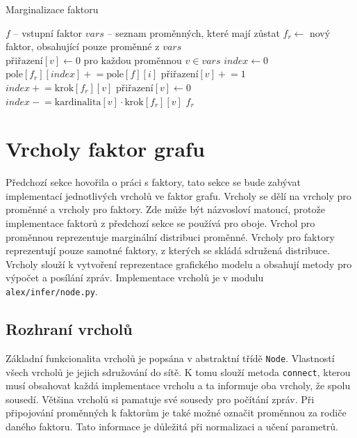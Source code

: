 \begin{algorithm}
\caption{Marginalizace faktoru}
\label{alg:marg}
\begin{algorithmic}
\State $f$ -- vstupní faktor
\State $vars$ -- seznam proměnných, které mají zůstat
\State
\State $f_r \gets$ nový faktor, obsahující pouze proměnné z $vars$
\State $\text{přiřazení}[v] \gets 0 \text{ pro každou proměnnou } v \in vars$
\State $index \gets 0$ 
\State
{}
	\State $\text{pole}[f_r][index] \mathrel{+}= \text{pole}[f][i]$
	\State
			\State $\text{přiřazení}[v] \mathrel{+}= 1$
			\State $index \mathrel{+}= \text{krok}[f_r][v]$
		\EndIf
		\State
			\State $\text{přiřazení}[v] \gets 0$
			\State $index \mathrel{-}= \text{kardinalita}[v] \cdot \text{krok}[f_r][v]$
		\EndIf
	\EndFor
\EndFor
\State \Return $f_r$
\EndFunction
\end{algorithmic}
\end{algorithm}

\section{Vrcholy faktor grafu}

Předchozí sekce hovořila o práci s faktory, tato sekce se bude zabývat implementací jednotlivých vrcholů ve faktor grafu.
Vrcholy se dělí na vrcholy pro proměnné a vrcholy pro faktory.
Zde může být názvosloví matoucí, protože implementace faktorů z předchozí sekce se používá pro oboje.
Vrchol pro proměnnou reprezentuje marginální distribuci proměnné.
Vrcholy pro faktory reprezentují pouze samotné faktory, z kterých se skládá sdružená distribuce.
Vrcholy slouží k vytvoření reprezentace grafického modelu a obsahují metody pro výpočet a posílání zpráv.
Implementace vrcholů je v modulu \texttt{alex/infer/node.py}.

\subsection{Rozhraní vrcholů}

Základní funkcionalita vrcholů je popsána v abstraktní třídě \texttt{Node}.
Vlastností všech vrcholů je jejich sdružování do sítě.
K tomu slouží metoda \texttt{connect}, kterou musí obsahovat každá implementace vrcholu a ta informuje oba vrcholy, že spolu sousedí.
Většina vrcholů si pamatuje své sousedy pro počítání zpráv.
Při připojování proměnných k faktorům je také možné označit proměnnou za rodiče daného faktoru.
Tato informace je důležitá při normalizaci a učení parametrů.


